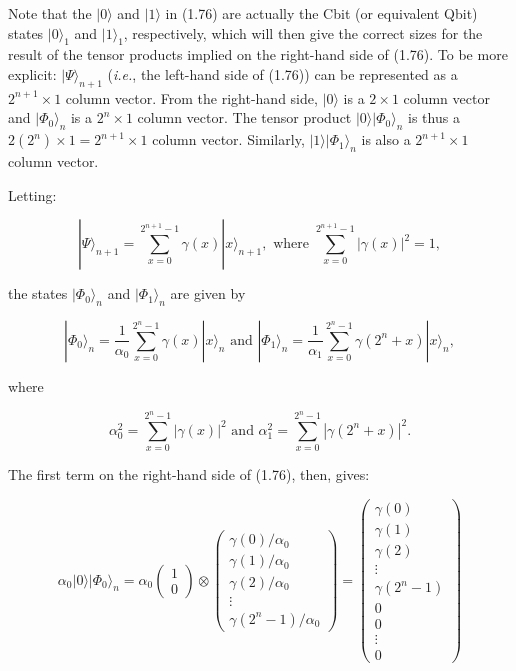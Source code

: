 \documentclass{article}
\begin{document}
\vspace{0.125in}

Note that the $|0\rangle$ and $|1\rangle$ in (1.76) are actually the Cbit (or equivalent Qbit) states $|0\rangle_1$ and $|1\rangle_1$, respectively, which will then give the correct sizes for the result of the tensor products implied on the right-hand side of (1.76). To be more explicit: $|\Psi\rangle_{n+1}$ (\textit{i.e.}, the left-hand side of (1.76)) can be represented as a $2^{n+1}\times 1$ column vector. From the right-hand side, $|0\rangle$ is a $2\times 1$ column vector and $|\Phi_0\rangle_{n}$ is a $2^n \times 1$ column vector. The tensor product $|0\rangle |\Phi_0\rangle_{n}$ is thus a $2(2^n)\times 1 = 2^{n+1}\times 1$ column vector. Similarly, $|1\rangle |\Phi_1\rangle_{n}$ is also a $2^{n+1}\times 1$ column vector.

\vspace{0.125in}

Letting:

\[\tag{1.77}
  |\Psi\rangle_{n+1} = \sum_{x=0}^{2^{n+1}-1}\gamma(x)|x\rangle_{n+1},
  \text{ where }
  \sum_{x=0}^{2^{n+1}-1}|\gamma(x)|^2 = 1,
\]

the states $|\Phi_0\rangle_n$ and $|\Phi_1\rangle_n$ are given by

\[\tag{1.78}
  |\Phi_0\rangle_n = \frac{1}{\alpha_0}
  \sum_{x=0}^{2^{n}-1}\gamma(x)|x\rangle_{n}
  \text{ and }
  |\Phi_1\rangle_n = \frac{1}{\alpha_1}
  \sum_{x=0}^{2^{n}-1}\gamma(2^n + x)|x\rangle_{n},
\]

where

\[\tag{1.79}
\alpha^2_0 = \sum_{x=0}^{2^{n}-1}|\gamma(x)|^2
\text{ and }
\alpha^2_1 = \sum_{x=0}^{2^{n}-1}|\gamma(2^n + x)|^2.
\]

The first term on the right-hand side of (1.76), then, gives:

\[
  \alpha_0 |0\rangle |\Phi_0\rangle_n
  =
  \alpha_0 \begin{pmatrix}1\\0\end{pmatrix}
  \otimes
  \begin{pmatrix}\gamma(0)/\alpha_0\\
                 \gamma(1)/\alpha_0\\
                 \gamma(2)/\alpha_0\\ \vdots \\
                 \gamma(2^n - 1)/\alpha_0\end{pmatrix}
  =
  \begin{pmatrix}\gamma(0)\\
                 \gamma(1)\\
                 \gamma(2)\\ \vdots \\
                 \gamma(2^n - 1) \\
                 0 \\ 0 \\ \vdots \\ 0
                 \end{pmatrix}
\]
\end{document}
